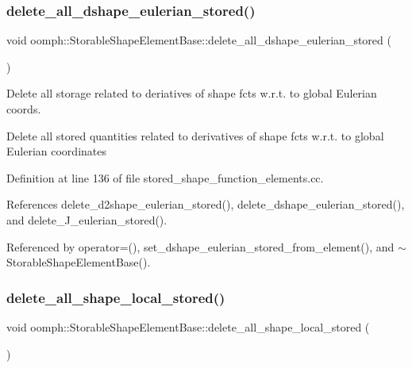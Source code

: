 \subsubsection{\texorpdfstring{delete\+\_\+all\+\_\+dshape\+\_\+eulerian\+\_\+stored()}{delete\_all\_dshape\_eulerian\_stored()}}
{\footnotesize\ttfamily void oomph\+::\+Storable\+Shape\+Element\+Base\+::delete\+\_\+all\+\_\+dshape\+\_\+eulerian\+\_\+stored (\begin{DoxyParamCaption}{ }\end{DoxyParamCaption})}



Delete all storage related to deriatives of shape fcts w.\+r.\+t. to global Eulerian coords. 

Delete all stored quantities related to derivatives of shape fcts w.\+r.\+t. to global Eulerian coordinates 

Definition at line 136 of file stored\+\_\+shape\+\_\+function\+\_\+elements.\+cc.



References delete\+\_\+d2shape\+\_\+eulerian\+\_\+stored(), delete\+\_\+dshape\+\_\+eulerian\+\_\+stored(), and delete\+\_\+\+J\+\_\+eulerian\+\_\+stored().



Referenced by operator=(), set\+\_\+dshape\+\_\+eulerian\+\_\+stored\+\_\+from\+\_\+element(), and $\sim$\+Storable\+Shape\+Element\+Base().

\mbox{\label{classoomph_1_1StorableShapeElementBase_ae4707f6f7c3ecdf1db110d882ddab8bb}} 
\subsubsection{\texorpdfstring{delete\+\_\+all\+\_\+shape\+\_\+local\+\_\+stored()}{delete\_all\_shape\_local\_stored()}}
{\footnotesize\ttfamily void oomph\+::\+Storable\+Shape\+Element\+Base\+::delete\+\_\+all\+\_\+shape\+\_\+local\+\_\+stored (\begin{DoxyParamCaption}{ }\end{DoxyParamCaption})}



